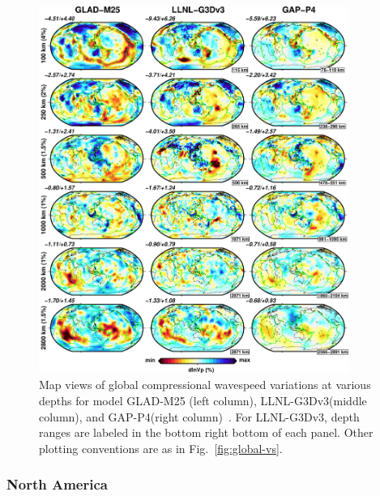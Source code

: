 \begin{figure}
\includegraphics[width=0.9\textwidth]{ch-GLADM25/figures/depth_slice/globe_vp_LLNL-GAP.pdf}
  \caption[Map views of global compressional wavespeed variations at various depths]
  {\small{Map views of global compressional wavespeed variations at various depths for model
  GLAD-M25 (left column), LLNL-G3Dv3(middle column)\cite{simmons2012llnl}, and
  GAP-P4(right column)~\cite{fukao2013subducted}.
  For LLNL-G3Dv3, depth ranges are labeled in the bottom right
  bottom of each panel. Other plotting conventions are as in Fig.~\ref{fig:global-vs}.}}
\label{fig:global-vp}
\centering
\end{figure}

\subsubsection{North America}

